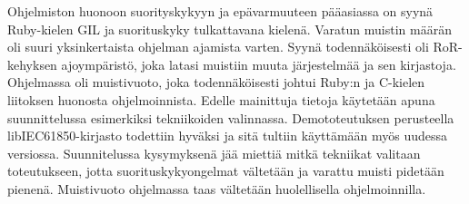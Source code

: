 Ohjelmiston huonoon suorityskykyyn ja epävarmuuteen pääasiassa on syynä Ruby-kielen GIL ja suorituskyky tulkattavana kielenä. Varatun muistin määrän oli suuri yksinkertaista ohjelman ajamista varten. Syynä todennäköisesti oli RoR-kehyksen ajoympäristö, joka latasi muistiin muuta järjestelmää ja sen kirjastoja. Ohjelmassa oli muistivuoto, joka todennäköisesti johtui Ruby:n ja C-kielen liitoksen huonosta ohjelmoinnista. Edelle mainittuja tietoja käytetään apuna suunnittelussa esimerkiksi tekniikoiden valinnassa. Demototeutuksen perusteella libIEC61850-kirjasto todettiin hyväksi ja sitä tultiin käyttämään myös uudessa versiossa. Suunnitelussa kysymyksenä jää miettiä mitkä tekniikat valitaan toteutukseen, jotta suorituskykyongelmat vältetään ja varattu muisti pidetään pienenä. Muistivuoto ohjelmassa taas vältetään huolellisella ohjelmoinnilla.